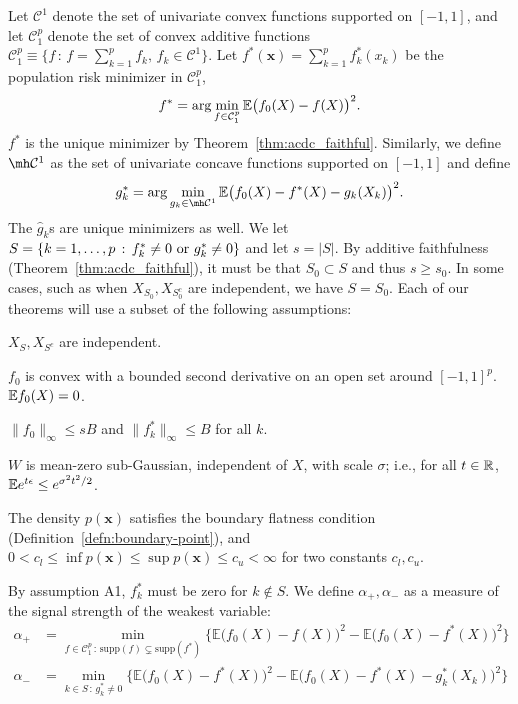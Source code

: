 Let $\mathcal{C}^1$ denote the set of univariate convex functions
supported on $[-1,1]$, 
and let  $\mathcal{C}_1^{p}$ denote the set of convex additive functions
$\mathcal{C}_1^p \equiv \{ f \,:\, f = \sum_{k=1}^p f_k, \,
   f_k \in \mathcal{C}^1 \} $.  
Let $f^*(\mathbf{x}) = \sum_{k=1}^p f^*_k(x_k)$ be the population risk
minimizer in $\mathcal{C}_1^p$, 
\begin{equation}
f^* = \arg\min_{f \in \mathcal{C}_1^p} {\mathbb E}\big(f_0(X) - f(X)
\big)^2.
\end{equation}
$f^*$ is the unique minimizer by Theorem~\ref{thm:acdc_faithful}. Similarly, we define $\mh \mathcal{C}^1$ as the set of univariate concave functions supported on $[-1, 1]$ and define
\begin{equation}
g^*_k = \arg\min_{g_k \in \mh \mathcal{C}^1} \E \big( f_0(X) - f^*(X)
- g_k(X_k) \big)^2.
\end{equation}
The $\hat{g}_k$s are unique minimizers as well. We let $S = \{ k =
1,\ldots,p \,:\, f^*_k \neq 0 \textrm{ or } g^*_k \neq 0\}$ and let $s =
|S|$. By additive faithfulness (Theorem~\ref{thm:acdc_faithful}), it
must be that $S_0 \subset S$ and thus $s \geq s_0$. In some cases,
such as when $X_{S_0}, X_{S^c_0}$ are independent, we have $S = S_0$.
Each of our theorems will use a subset of the following assumptions:
\begin{packed_enum}
\item[A1:] $X_S, X_{S^c}$ are independent. 
\item[A2:] $f_0$ is convex with a bounded second derivative on an open set around $[-1,1]^p$. ${\mathbb E} f_0(X) = 0$.
\item[A3:] $\|f_0\|_\infty \leq sB$ and $\| f^*_k \|_\infty \leq B$ for all $k$.
\item[A4:] $W$ is mean-zero sub-Gaussian, independent of $X$, with scale $\sigma$; i.e., for all $t \in {\mathbb R}$, ${\mathbb E} e^{t \epsilon} \leq e^{\sigma^2 t^2 / 2}$.
\item[A5:] The density $p(\mathbf{x})$ satisfies the boundary flatness condition (Definition~\ref{defn:boundary-point}), and $0 < c_l \leq \inf p(\mathbf{x}) \leq \sup p(\mathbf{x}) \leq c_u < \infty$ for two constants $c_l, c_u$. 
\end{packed_enum}
By assumption A1, $f^*_k$ must be zero for $k\notin S$.
We define $\alpha_{+}, \alpha_{-}$ as a measure of the signal strength of the weakest variable:
\begin{align}
\alpha_{+} &= \min_{f \in \mathcal{C}_1^p \,:\, \textrm{supp}(f) \subsetneq \textrm{supp}(f^*)} 
       \Big\{ \mathbb{E} \big( f_0(X) - f(X) \big)^2 - 
        \mathbb{E} \big( f_0(X) - f^*(X) \big)^2  \Big\} \label{eqn:signal_level_defn} \\
\alpha_{-} &=   \min_{k \in S \,:\, g^*_k \neq 0}
      \Big\{ \mathbb{E} \big( f_0(X) - f^*(X) \big)^2 - 
    \mathbb{E} \big( f_0(X) - f^*(X) - g^*_k(X_k) \big)^2 \Big\} \nonumber
\end{align}
